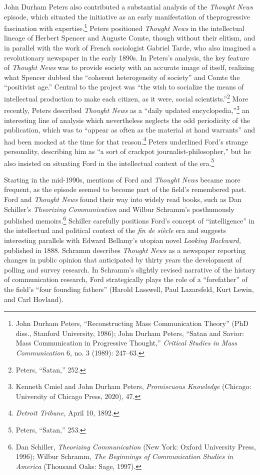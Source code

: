 \documentclass[twoside,symmetric,nobib,justified]{tufte-book}
\begin{document}
John Durham Peters also contributed a substantial analysis of the
\emph{Thought News} episode, which situated the initiative as an early
manifestation of the\newpage\noindent progressive fascination with expertise.\footnote{John
  Durham Peters, ``Reconstructing Mass Communication Theory'' (PhD
  diss., Stanford University, 1986); John Durham Peters, ``Satan and
  Savior: Mass Communication in Progressive Thought,'' \emph{Critical
  Studies in Mass Communication} 6, no. 3 (1989): 247--63.} Peters
positioned \emph{Thought News} in the intellectual lineage of Herbert
Spencer and Auguste Comte, though without their elitism, and in parallel
with the work of French sociologist Gabriel Tarde, who also imagined a
revolutionary newspaper in the early 1890s. In Peters's analysis, the
key feature of \emph{Thought News} was to provide society with an
accurate image of itself, realizing what Spencer dubbed the ``coherent
heterogeneity of society'' and Comte the ``positivist age.'' Central to
the project was ``the wish to socialize the means of intellectual
production to make each citizen, as it were, social
scientists.''\footnote{Peters, ``Satan,'' 252.} More recently, Peters
described \emph{Thought News} as a ``daily updated
encyclopedia,''\footnote{Kenneth Cmiel and John Durham Peters,
  \emph{Promiscuous Knowledge} (Chicago: University of Chicago Press,
  2020), 47.} an interesting line of analysis which nevertheless
neglects the odd periodicity of the publication, which was to ``appear
as often as the material at hand warrants'' and had been mocked at the
time for that reason.\footnote{\emph{Detroit Tribune,} April 10, 1892.}
Peters underlined Ford's strange personality, describing him as ``a sort
of crackpot journalist-philosopher,'' but he also insisted on situating
Ford in the intellectual context of the era.\footnote{Peters, ``Satan,''
  253.}

Starting in the mid-1990s, mentions of Ford and \emph{Thought News}
became more frequent, as the episode seemed to become part of the
field's remembered past. Ford and \emph{Thought News} found their way
into widely read books, such as Dan Schiller's \emph{Theorizing
Communication} and Wilbur Schramm's posthumously published
memoirs.\footnote{Dan Schiller, \emph{Theorizing Communication} (New
  York: Oxford University Press, 1996); Wilbur Schramm, \emph{The
  Beginnings of Communication Studies in America} (Thousand Oaks: Sage,
  1997).} Schiller carefully positions Ford's concept of
``intelligence'' in the intellectual and political context of the
\emph{fin de siècle} era and suggests interesting parallels with Edward
Bellamy's utopian novel \emph{Looking Backward,} published in 1888.
Schramm describes \emph{Thought News} as a newspaper reporting changes
in public opinion that anticipated by thirty years the development of
polling and survey research. In Schramm's slightly revised narrative of
the history of communication research, Ford strategically plays the role
of a ``forefather'' of the field's ``four founding fathers'' (Harold
Lasswell, Paul Lazarsfeld, Kurt Lewin, and Carl Hovland).
\end{document}
